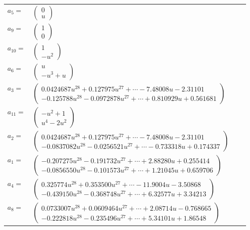 \documentclass[1p]{elsarticle_modified}
\theoremstyle{definition}
\begin{document}
\begin{tabular}{m{7pt} m{180pt} m{7pt} m{180pt} }
\flushright $a_{5}=$&$\begin{pmatrix}0\\u\end{pmatrix}$ \\
\flushright $a_{9}=$&$\begin{pmatrix}1\\0\end{pmatrix}$ \\
\flushright $a_{10}=$&$\begin{pmatrix}1\\- u^2\end{pmatrix}$ \\
\flushright $a_{6}=$&$\begin{pmatrix}u\\- u^3+u\end{pmatrix}$ \\
\flushright $a_{3}=$&$\begin{pmatrix}0.0424687 u^{28}+0.127975 u^{27}+\cdots-7.48008 u-2.31101\\-0.125788 u^{28}-0.0972878 u^{27}+\cdots+0.810929 u+0.561681\end{pmatrix}$ \\
\flushright $a_{11}=$&$\begin{pmatrix}- u^2+1\\u^4-2 u^2\end{pmatrix}$ \\
\flushright $a_{2}=$&$\begin{pmatrix}0.0424687 u^{28}+0.127975 u^{27}+\cdots-7.48008 u-2.31101\\-0.0837082 u^{28}-0.0256521 u^{27}+\cdots-0.733318 u+0.174337\end{pmatrix}$ \\
\flushright $a_{1}=$&$\begin{pmatrix}-0.207275 u^{28}-0.191732 u^{27}+\cdots+2.88280 u+0.255414\\-0.0856550 u^{28}-0.101573 u^{27}+\cdots+1.21045 u+0.659706\end{pmatrix}$ \\
\flushright $a_{4}=$&$\begin{pmatrix}0.325774 u^{28}+0.353500 u^{27}+\cdots-11.9004 u-3.50868\\-0.439150 u^{28}-0.368748 u^{27}+\cdots+6.32577 u+3.34213\end{pmatrix}$ \\
\flushright $a_{8}=$&$\begin{pmatrix}0.0733007 u^{28}+0.0609464 u^{27}+\cdots+2.08714 u-0.768665\\-0.222818 u^{28}-0.235496 u^{27}+\cdots+5.34101 u+1.86548\end{pmatrix}$ \\

\end{tabular}
\end{document}
